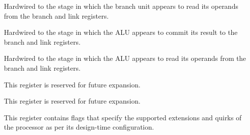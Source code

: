 \implementation{}

\reset{****}
Hardwired to the stage in which the branch unit appears to read its operands 
from the branch and link registers.

\implementation{}

\reset{****}
Hardwired to the stage in which the ALU appears to commit its result to the
branch and link registers.

\implementation{}

\reset{****}
Hardwired to the stage in which the ALU appears to read its operands from the
branch and link registers.

\implementation{}


This register is reserved for future expansion.


This register is reserved for future expansion.


This register contains flags that specify the supported extensions and quirks
of the processor as per its design-time configuration.

